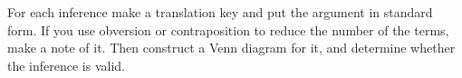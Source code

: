\begin{exercises}
 
   
\end{exercises}



\noindent \problempart For each inference make a translation key and put the argument in standard form. If you use obversion or contraposition to reduce the number of the terms, make a note of it. Then construct a Venn diagram for it, and determine whether the inference is valid. 

